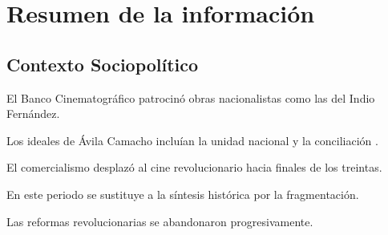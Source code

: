 \section{Resumen de la información}
\subsection{Contexto Sociopolítico}
\begin{compactitem}
\item El Banco Cinematográfico patrocinó obras nacionalistas como las del Indio Fernández.\autocite[10]{garcia_riera_historia_1992} 
\item  Los ideales de Ávila Camacho incluían la unidad nacional y la conciliación \autocite[365-366]{sanchez_vi._2010}.
\item El comercialismo desplazó al cine revolucionario hacia finales de los treintas.\autocite[439]{cosio_villegas_notas_1976}
\item En este periodo se sustituye a la síntesis histórica por la fragmentación.\autocite[440]{cosio_villegas_notas_1976}
\item Las reformas revolucionarias se abandonaron progresivamente. \autocite[62]{consuelo_rangel_ley_2006}

\end{compactitem}

